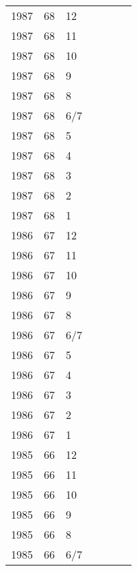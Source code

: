 \begin{longtable}{ |l|l|l|l|p{2.7cm}|l|p{2cm}| }
 1987 & 68 &    12 &         &                &  & \\
 1987 & 68 &    11 &         &                &  & \\
 1987 & 68 &    10 &         &                &  & \\
 1987 & 68 &     9 &         &                &  & \\
 1987 & 68 &     8 &         &                &  & \\
 1987 & 68 &   6/7 &         &                &  & \\
 1987 & 68 &     5 &         &                &  & \\
 1987 & 68 &     4 &         &                &  & \\
 1987 & 68 &     3 &         &                &  & \\
 1987 & 68 &     2 &         &                &  & \\
 1987 & 68 &     1 &         &                &  & \\
 1986 & 67 &    12 &         &                &  & \\
 1986 & 67 &    11 &         &                &  & \\
 1986 & 67 &    10 &         &                &  & \\
 1986 & 67 &     9 &         &                &  & \\
 1986 & 67 &     8 &         &                &  & \\
 1986 & 67 &   6/7 &         &                &  & \\
 1986 & 67 &     5 &         &                &  & \\
 1986 & 67 &     4 &         &                &  & \\
 1986 & 67 &     3 &         &                &  & \\
 1986 & 67 &     2 &         &                &  & \\
 1986 & 67 &     1 &         &                &  & \\
 1985 & 66 &    12 &         &                &  & \\
 1985 & 66 &    11 &         &                &  & \\
 1985 & 66 &    10 &         &                &  & \\
 1985 & 66 &     9 &         &                &  & \\
 1985 & 66 &     8 &         &                &  & \\
 1985 & 66 &   6/7 &         &                &  & \\

\end{longtable}
